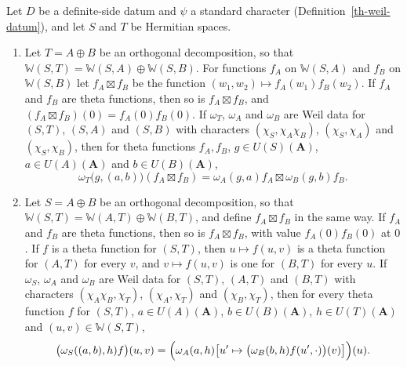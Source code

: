 \begin{lemma}\label{th-tensor-rule}
Let $D$ be a definite-side datum and $\psi$ a standard character
(Definition~\ref{th-weil-datum}), and let $S$ and $T$ be Hermitian spaces.
\begin{enumerate}
\item Let $T=A\oplus B$ be an orthogonal decomposition, so that
  $\mathbb W(S,T)=\mathbb W(S,A)\oplus\mathbb W(S,B)$. For functions $f_A$ on
  $\mathbb W(S,A)$ and $f_B$ on $\mathbb W(S,B)$ let $f_A\boxtimes f_B$ be the
  function $(w_1,w_2)\mapsto f_A(w_1)f_B(w_2)$. If $f_A$ and $f_B$ are theta
  functions, then so is $f_A\boxtimes f_B$, and
  $(f_A\boxtimes f_B)(0)=f_A(0)f_B(0)$. If $\omega_T$, $\omega_A$ and
  $\omega_B$ are Weil data for $(S,T)$, $(S,A)$ and $(S,B)$ with characters
  $(\chi_S,\chi_A\chi_B)$, $(\chi_S,\chi_A)$ and $(\chi_S,\chi_B)$, then for
  theta functions $f_A,f_B$, $g\in U(S)(\mathbf A)$, $a\in U(A)(\mathbf A)$ and
  $b\in U(B)(\mathbf A)$,
  \[
  \omega_T\bigl(g,(a,b)\bigr)(f_A\boxtimes f_B)=\omega_A(g,a)f_A\boxtimes\omega_B(g,b)f_B .
  \]
\item Let $S=A\oplus B$ be an orthogonal decomposition, so that
  $\mathbb W(S,T)=\mathbb W(A,T)\oplus\mathbb W(B,T)$, and define
  $f_A\boxtimes f_B$ in the same way. If $f_A$ and $f_B$ are theta functions,
  then so is $f_A\boxtimes f_B$, with value $f_A(0)f_B(0)$ at $0$. If $f$ is a
  theta function for $(S,T)$, then $u\mapsto f(u,v)$ is a theta function for
  $(A,T)$ for every $v$, and $v\mapsto f(u,v)$ is one for $(B,T)$ for every $u$.
  If $\omega_S$, $\omega_A$ and $\omega_B$ are Weil data for $(S,T)$, $(A,T)$
  and $(B,T)$ with characters $(\chi_A\chi_B,\chi_T)$, $(\chi_A,\chi_T)$ and
  $(\chi_B,\chi_T)$, then for every theta function $f$ for $(S,T)$,
  $a\in U(A)(\mathbf A)$, $b\in U(B)(\mathbf A)$, $h\in U(T)(\mathbf A)$ and
  $(u,v)\in\mathbb W(S,T)$,
  \[
  \bigl(\omega_S((a,b),h)f\bigr)(u,v)
  =\Bigl(\omega_A(a,h)\bigl[u'\mapsto\bigl(\omega_B(b,h)f(u',\cdot)\bigr)(v)\bigr]\Bigr)(u).
  \]
\end{enumerate}
\end{lemma}
